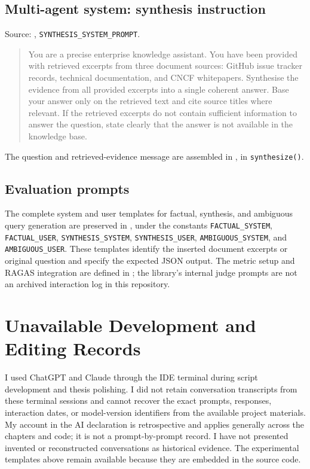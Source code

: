 \subsection*{Multi-agent system: synthesis instruction}
Source: , \texttt{SYNTHESIS\_SYSTEM\_PROMPT}.
\begin{quote}\small
You are a precise enterprise knowledge assistant. You have been provided with retrieved excerpts from three document sources: GitHub issue tracker records, technical documentation, and CNCF whitepapers. Synthesise the evidence from all provided excerpts into a single coherent answer. Base your answer only on the retrieved text and cite source titles where relevant. If the retrieved excerpts do not contain sufficient information to answer the question, state clearly that the answer is not available in the knowledge base.
\end{quote}
The question and retrieved-evidence message are assembled in , in \texttt{synthesize()}.

\subsection*{Evaluation prompts}
The complete system and user templates for factual, synthesis, and ambiguous query generation are preserved in , under the constants \texttt{FACTUAL\_SYSTEM}, \texttt{FACTUAL\_USER}, \texttt{SYNTHESIS\_SYSTEM}, \texttt{SYNTHESIS\_USER}, \texttt{AMBIGUOUS\_SYSTEM}, and \texttt{AMBIGUOUS\_USER}. These templates identify the inserted document excerpts or original question and specify the expected JSON output. The metric setup and RAGAS integration are defined in ; the library's internal judge prompts are not an archived interaction log in this repository.

\section{Unavailable Development and Editing Records}

I used ChatGPT and Claude through the IDE terminal during script development and thesis polishing. I did not retain conversation transcripts from these terminal sessions and cannot recover the exact prompts, responses, interaction dates, or model-version identifiers from the available project materials. My account in the AI declaration is retrospective and applies generally across the chapters and code; it is not a prompt-by-prompt record. I have not presented invented or reconstructed conversations as historical evidence. The experimental templates above remain available because they are embedded in the source code.
